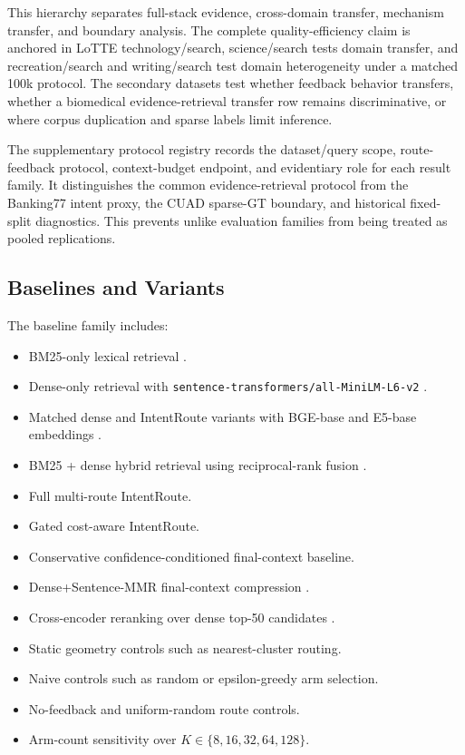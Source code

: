 This hierarchy separates full-stack evidence, cross-domain transfer, mechanism transfer, and boundary analysis. The complete quality-efficiency claim is anchored in LoTTE technology/search, science/search tests domain transfer, and recreation/search and writing/search test domain heterogeneity under a matched 100k protocol. The secondary datasets test whether feedback behavior transfers, whether a biomedical evidence-retrieval transfer row remains discriminative, or where corpus duplication and sparse labels limit inference.

The supplementary protocol registry records the dataset/query scope, route-feedback protocol, context-budget endpoint, and evidentiary role for each result family. It distinguishes the common evidence-retrieval protocol from the Banking77 intent proxy, the CUAD sparse-GT boundary, and historical fixed-split diagnostics. This prevents unlike evaluation families from being treated as pooled replications.

\subsection{Baselines and Variants}
\label{sec:05-experimental-setup:baselines-and-variants}

The baseline family includes:

\begin{itemize}
\item BM25-only lexical retrieval \citep{robertson2009bm25}.
\item Dense-only retrieval with \nolinkurl{sentence-transformers/all-MiniLM-L6-v2} \citep{reimers2019sbert,wang2020minilm}.
\item Matched dense and IntentRoute variants with BGE-base and E5-base embeddings \citep{xiao2024cpack,wang2022e5}.
\item BM25 + dense hybrid retrieval using reciprocal-rank fusion \citep{cormack2009rrf}.
\item Full multi-route IntentRoute.
\item Gated cost-aware IntentRoute.
\item Conservative confidence-conditioned final-context baseline.
\item Dense+Sentence-MMR final-context compression \citep{carbonell1998mmr}.
\item Cross-encoder reranking over dense top-50 candidates \citep{nogueira2019reranking}.
\item Static geometry controls such as nearest-cluster routing.
\item Naive controls such as random or epsilon-greedy arm selection.
\item No-feedback and uniform-random route controls.
\item Arm-count sensitivity over $K \in \{8,16,32,64,128\}$.
\end{itemize}

